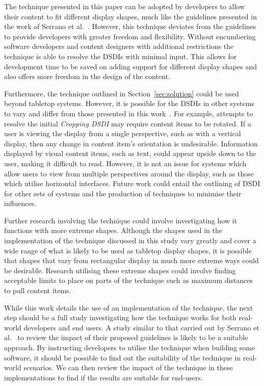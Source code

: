 \documentclass[twocolumn,compsoc]{cvm}
\begin{document}
{The technique presented in this paper can be adopted by developers to allow their content to fit different display shapes, much like the guidelines presented in the work of Serrano et al.~\cite{Serrano2016,Serrano2017}.
However, this technique deviates from the guidelines to provide developers with greater freedom and flexibility.
Without encumbering software developers and content designers with additional restrictions the technique is able to resolve the \acp{DSDI} with minimal input.
This allows for development time to be saved on adding support for different display shapes and also offers more freedom in the design of the content.

Furthermore, the technique outlined in Section~\ref{sec:solution} could be used beyond tabletop systems.
However, it is possible for the \acp{DSDI} in other systems to vary and differ from those presented in this work~\cite{Serrano2017}. 
For example, attempts to resolve the initial {\emph{Cropping \ac{DSDI}}} may require content items to be rotated.
If a user is viewing the display from a single perspective, such as with a vertical display, then any change in content item's orientation is undesirable.
Information displayed by visual content items, such as text, could appear upside down to the user, making it difficult to read.
However, it is not an issue for systems which allow users to view from multiple perspectives around the display, such as those which utilise horizontal interfaces.
Future work could entail the outlining of \ac{DSDI} for other sets of systems and the production of techniques to minimise their influences.

Further research involving the technique could involve investigating how it functions with more extreme shapes.
Although the shapes used in the implementation of the technique discussed in this study vary greatly and cover a wide range of what is likely to be used as tabletop display shapes, it is possible that shapes that vary from rectangular display in much more extreme ways could be desirable.
Research utilising these extreme shapes could involve finding acceptable limits to place on parts of the technique such as maximum distances to pull content items.

While this work details the use of an implementation of the technique, the next step should be a full study investigating how the technique works for both real-world developers and end users.
A study similar to that carried out by Serrano et al.~\cite{Serrano2017} to review the impact of their proposed guidelines is likely to be a suitable approach.
By instructing developers to utilise the technique when building some software, it should be possible to find out the suitability of the technique in real-world scenarios.
We can then review the impact of the technique in these implementations to find if the results are suitable for end-users.

}
\end{document}
